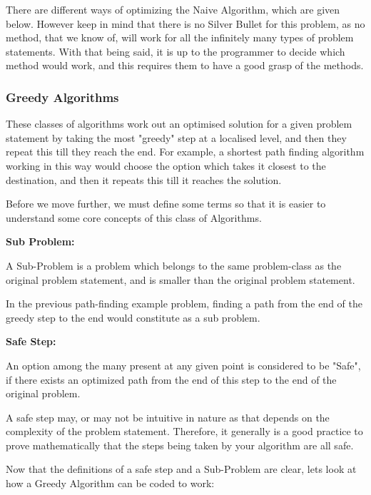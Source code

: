 \documentclass{article}
\theoremstyle{definition}
\theoremstyle{example}
\begin{document}
There are different ways of optimizing the Naive Algorithm, which are given below. However keep in mind that there is no Silver Bullet for this problem, as no method, that we know of, will work for all the infinitely many types of problem statements. With that being said, it is up to the programmer to decide which method would work, and this requires them to have a good grasp of the methods.

\subsubsection{\Large Greedy Algorithms}
\hspace{6mm}These classes of algorithms work out an optimised solution for a given problem statement by taking the most "greedy" step at a localised level, and then they repeat this till they reach the end. For example, a shortest path finding algorithm working in this way would choose the option which takes it closest to the destination, and then it repeats this till it reaches the solution.\par
\vspace{4mm}
Before we move further, we must define some terms so that it is easier to understand some core concepts of this class of Algorithms.\par\newpage
\vspace{5mm}
\noindent \textbf{Sub Problem:}\par
\vspace{2mm}
A Sub-Problem is a problem which belongs to the same problem-class as the original problem statement, and is smaller than the original problem statement.\par
\vspace{3mm} In the previous path-finding example problem, finding a path from the end of the greedy step to the end would constitute as a sub problem.\par
\vspace{5mm}
\noindent \textbf{Safe Step:}\par
\vspace{2mm}
An option among the many present at any given point is considered to be "Safe", if there exists an optimized path from the end of this step to the end of the original problem.\par
\vspace{4mm}
A safe step may, or may not be intuitive in nature as that depends on the complexity of the problem statement. Therefore, it generally is a good practice to prove mathematically that the steps being taken by your algorithm are all safe. \par
\vspace{4mm}
\noindent Now that the definitions of a safe step and a Sub-Problem are clear, lets look at how a Greedy Algorithm can be coded to work:
\end{document}
